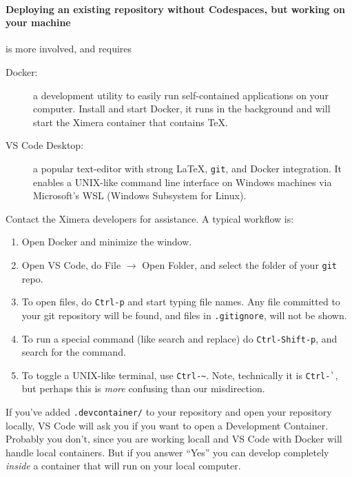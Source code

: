 \documentclass{ximera}
\begin{document}
\paragraph{Deploying an existing repository without Codespaces, but working on your machine} is more involved, and requires
\begin{description}
    \item[Docker:] a development utility to easily run
        self-contained applications on your
        computer. Install and start Docker, it runs in the background and will start the Ximera container that contains TeX.
    \item[VS Code Desktop:] a popular text-editor with strong \LaTeX, \verb!git!,
        and Docker integration. It enables a UNIX-like command line interface on
        Windows machines via Microsoft's WSL (Windows Subsystem for Linux).
\end{description}
Contact the Ximera developers for assistance. A typical workflow is:
\begin{enumerate}
    \item Open Docker and minimize the window.
    \item Open VS Code, do File $\to$ Open Folder, and select the
          folder of your \verb!git! repo.
    \item To open files, do \verb!Ctrl-p! and start typing file names. Any
          file
          committed to your git repository will be found, and files in
          \verb!.gitignore!, will not be shown.
    \item To run a special command (like search and replace) do
          \verb!Ctrl-Shift-p!, and search for the command.
    \item To toggle a UNIX-like terminal, use \verb!Ctrl-~!. Note, technically
          it is \verb!Ctrl-`!, but perhaps this is \textit{more} confusing than our
          misdirection.
\end{enumerate}

\begin{warning}
    If you've added \verb!.devcontainer/! to your repository and open your repository
    locally, VS Code will ask you if you want to open a Development Container.
    Probably you don't, since you are working locall and VS Code with Docker will handle local containers.
    But if you answer ``Yes'' you can develop completely \textit{inside} a container that will run on your local computer. 
\end{warning}
\end{document}
